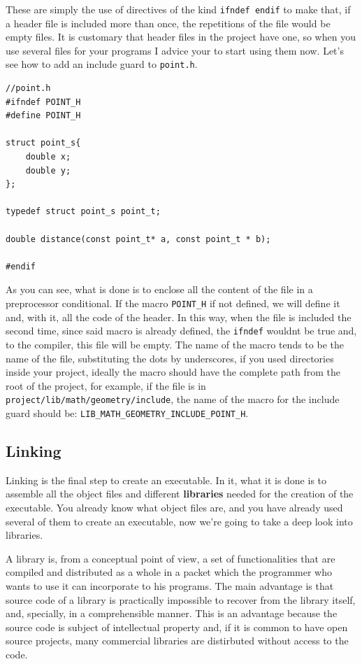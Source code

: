 \documentclass[a4paper]{article}
\begin{document}
These are simply the use of directives of the kind \verb!ifndef endif! to make
that, if a header file is included more than once, the repetitions of the file
would be empty files. It is customary that header files in the project have one,
so when you use several files for your programs I advice your to start using
them now. Let's see how to add an include guard to \verb!point.h!.

\noindent
\begin{minipage}[H]{\linewidth}
\mbox{}
\begin{lstlisting}[style=C,
caption={Example of include guard},
label={lst:includeGuard}]
//point.h
#ifndef POINT_H
#define POINT_H

struct point_s{
    double x;
    double y;
};

typedef struct point_s point_t;

double distance(const point_t* a, const point_t * b);

#endif
\end{lstlisting}
\end{minipage}

As you can see, what is done is to enclose all the content of the file in a
preprocessor conditional. If the macro \verb!POINT_H! if not defined, we will
define it and, with it, all the code of the header. In this way, when the file
is included the second time, since said macro is already defined, the
\verb!ifndef! wouldnt be true and, to the compiler, this file will be empty.
The name of the macro tends to be the name of the file, substituting the dots
by underscores, if you used directories inside your project, ideally the macro
should have the complete path from the root of the project, for example, if the
file is in \verb!project/lib/math/geometry/include!, the name of the macro for
the include guard should be: \verb!LIB_MATH_GEOMETRY_INCLUDE_POINT_H!.

\subsection{Linking}
Linking is the final step to create an executable. In it, what it is done is to
assemble all the object files and different \textbf{libraries} needed for the
creation of the executable. You already know what object files are, and you have
already used several of them to create an executable, now we're going to take a
deep look into libraries.

A library is, from a conceptual point of view, a set of functionalities that are
compiled and distributed as a whole in a packet which the programmer who wants
to use it can incorporate to his programs. The main advantage is that source
code of a library is practically impossible to recover from the library itself,
and, specially, in a comprehensible manner. This is an advantage because the
source code is subject of intellectual property and, if it is common to have
open source projects, many commercial libraries are distirbuted without access
to the code.
\end{document}
